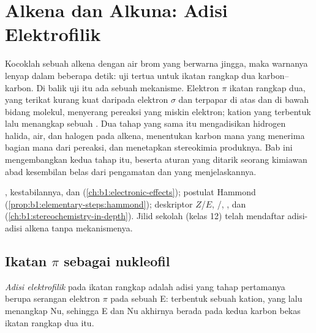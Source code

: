 \chapter{Alkena dan Alkuna: Adisi Elektrofilik}\label{ch:b1:electrophilic-additions}

Kocoklah sebuah alkena dengan air brom yang berwarna jingga, maka warnanya
lenyap dalam beberapa detik: uji tertua untuk ikatan rangkap dua
karbon--karbon. Di balik uji itu ada sebuah mekanisme. Elektron $\pi$
ikatan rangkap dua, yang terikat kurang kuat daripada elektron $\sigma$
dan terpapar di atas dan di bawah bidang molekul, menyerang pereaksi yang
miskin elektron; kation yang terbentuk lalu menangkap sebuah .
Dua tahap yang sama itu mengadisikan hidrogen halida, air, dan halogen
pada alkena, menentukan karbon mana yang menerima bagian mana dari
pereaksi, dan menetapkan stereokimia produknya. Bab ini mengembangkan
kedua tahap itu, beserta aturan yang ditarik seorang kimiawan abad
kesembilan belas dari pengamatan dan  yang menjelaskannya.

\begin{recall}
, kestabilannya, dan  (\cref{ch:b1:electronic-effects});
postulat Hammond (\cref{prop:b1:elementary-steps:hammond}); deskriptor
$Z$/$E$, /, , dan 
(\cref{ch:b1:stereochemistry-in-depth}). Jilid sekolah (kelas 12) telah
mendaftar adisi-adisi alkena tanpa mekanismenya.
\end{recall}

\section{Ikatan \texorpdfstring{$\pi$}{pi} sebagai nukleofil}

\begin{definition}\label{def:b1:electrophilic-additions:electrophilic-addition}
\emph{Adisi elektrofilik} pada ikatan rangkap
adalah adisi yang tahap pertamanya berupa serangan elektron $\pi$ pada
sebuah  E: terbentuk sebuah kation, yang lalu menangkap
 Nu, sehingga E dan Nu akhirnya berada pada kedua karbon bekas
ikatan rangkap dua itu.
\end{definition}

